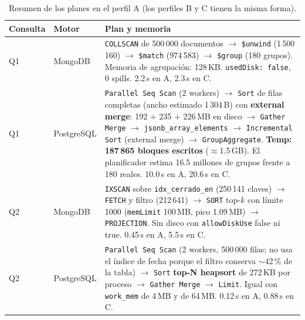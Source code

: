 \documentclass[11pt,letterpaper]{article}
\begin{document}
\begin{table}[H]\centering\small
\caption{Resumen de los planes en el perfil A (los perfiles B y C tienen la misma forma).}
\label{tab:planes}
\begin{tabularx}{\linewidth}{llX}
\toprule
Consulta & Motor & Plan y memoria \\
\midrule
Q1 & MongoDB & \texttt{COLLSCAN} de 500\,000 documentos $\rightarrow$ \texttt{\$unwind} (1\,500\,160) $\rightarrow$ \texttt{\$match} (974\,583) $\rightarrow$ \texttt{\$group} (180 grupos). Memoria de agrupación: 128\,KB. \texttt{usedDisk: false}, 0 spills. 2.2\,s en A, 2.3\,s en C. \\
\addlinespace
Q1 & PostgreSQL & \texttt{Parallel Seq Scan} (2 workers) $\rightarrow$ \texttt{Sort} de filas completas (ancho estimado 1\,304\,B) con \textbf{external merge}: 192 + 235 + 226\,MB en disco $\rightarrow$ \texttt{Gather Merge} $\rightarrow$ \texttt{jsonb\_array\_elements} $\rightarrow$ \texttt{Incremental Sort} (external merge) $\rightarrow$ \texttt{GroupAggregate}. \textbf{Temp: 187\,865 bloques escritos} ($\approx$1.5\,GB). El planificador estima 16.5 millones de grupos frente a 180 reales. 10.0\,s en A, 20.6\,s en C. \\
\addlinespace
Q2 & MongoDB & \texttt{IXSCAN} sobre \texttt{idx\_cerrado\_en} (250\,141 claves) $\rightarrow$ \texttt{FETCH} y filtro (212\,641) $\rightarrow$ \texttt{SORT} top-$k$ con límite 1000 (\texttt{memLimit} 100\,MB, pico 1.09\,MB) $\rightarrow$ \texttt{PROJECTION}. Sin disco con \texttt{allowDiskUse} false ni true. 0.45\,s en A, 5.5\,s en C. \\
\addlinespace
Q2 & PostgreSQL & \texttt{Parallel Seq Scan} (2 workers, 500\,000 filas; no usa el índice de fecha porque el filtro conserva $\sim$42\,\% de la tabla) $\rightarrow$ \texttt{Sort} \textbf{top-N heapsort} de 272\,KB por proceso $\rightarrow$ \texttt{Gather Merge} $\rightarrow$ \texttt{Limit}. Igual con \texttt{work\_mem} de 4\,MB y de 64\,MB. 0.12\,s en A, 0.88\,s en C. \\
\bottomrule
\end{tabularx}
\end{table}
\end{document}
